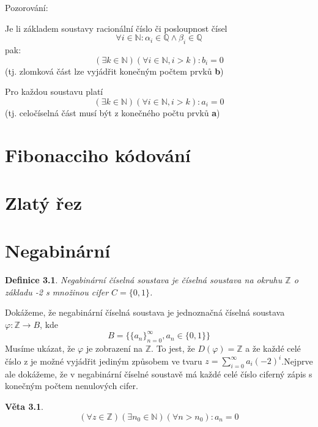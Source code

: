 \documentclass[12pt]{book}
\newtheorem{definice}{Definice}
\newtheorem{veta}{Věta}
\begin{document}
\newpage
Pozorování:


Je li základem soustavy racionální číslo či posloupnost čísel
$$\forall i \in \mathbb{N} : \alpha_i \in \mathbb{Q} \land \beta_i \in \mathbb{Q}$$
pak:
$$ (\exists k \in \mathbb{N} )(\forall i \in \mathbb{N}, i>k): b_i = 0 $$
(tj. zlomková část lze vyjádřit konečným počtem prvků \textbf{b})\newline \newline

Pro každou soustavu platí
$$ (\exists k \in \mathbb{N} )(\forall i \in \mathbb{N}, i>k): a_i = 0 $$
(tj. celočíselná část musí být  z konečného počtu prvků \textbf{a})


\chapter{Fibonacciho kódování}


\chapter{Zlatý řez}


\chapter{Negabinární}

\begin{definice}
	Negabinární číselná soustava je číselná soustava na okruhu $\mathbb{Z}$ o základu -2 s množinou cifer $C=\{0,1\}$.
\end{definice}
Dokážeme, že negabinární číselná soustava je jednoznačná číselná soustava
$\varphi:\mathbb{Z}\to B$, kde
$$B=\{\{a_n\}_{n=0}^\infty,a_n \in \{0,1\} \}$$
Musíme ukázat, že $\varphi$ je zobrazení na $\mathbb{Z}$. To jest, že $D(\varphi)=\mathbb{Z}$ a že každé celé číslo z je možné vyjádřit jediným způsobem ve tvaru $z=\sum_{i=0}^\infty a_i(-2)^i$.\newline Nejprve ale dokážeme, že v negabinární číselné soustavě má každé celé číslo ciferný zápis s konečným počtem nenulových cifer. 

\begin{veta}
	$$(\forall z \in \mathbb{Z})(\exists n_0 \in \mathbb{N}) (\forall n > n_0) : a_n = 0$$
	\end{veta}
\end{document}
